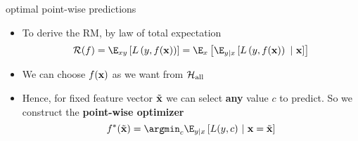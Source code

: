 \documentclass[11pt,compress,t,notes=noshow, xcolor=table]{beamer}
\begin{document}



% 
% 



\begin{frame}[t]{optimal point-wise predictions}  

\begin{itemize}

\item To derive the RM, by law of total expectation 
$$    \riskf = \E_{xy} \left[\Lxy\right] 
    = \E_x \left[\E_{y|x}\left[\Lxy~|~\xv\right]\right]$$

	\item We can choose $f(\mathbf{x})$ as we want from $\mathcal{H}_{\text{all}}$ %
	\item Hence, for fixed feature vector $\tilde{\mathbf{x}}$ we can select \textbf{any} value $c$ to predict. So we construct the \textbf{point-wise optimizer} 
 $$\fbayes(\xtil) = \argmin_c \E_{y|x}\left[L(y, c)~|~ \xv = \xtil \right] $$

\end{itemize}


\end{frame}
\end{document}
